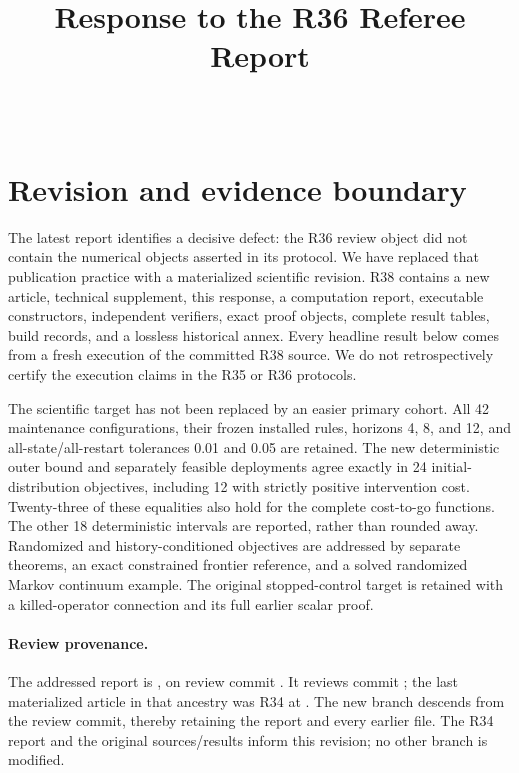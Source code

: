 

\begin{frontmatter}
\title{Response to the R36 Referee Report}
\begin{aug}\author[id=au1,addressref={add1}]{~}\address[id=add1]{}\end{aug}
\end{frontmatter}

\section{Revision and evidence boundary}
The latest report identifies a decisive defect: the R36 review object did not contain the numerical objects asserted in its protocol. We have replaced that publication practice with a materialized scientific revision. R38 contains a new article, technical supplement, this response, a computation report, executable constructors, independent verifiers, exact proof objects, complete result tables, build records, and a lossless historical annex. Every headline result below comes from a fresh execution of the committed R38 source. We do not retrospectively certify the execution claims in the R35 or R36 protocols.

The scientific target has not been replaced by an easier primary cohort. All 42 maintenance configurations, their frozen installed rules, horizons 4, 8, and 12, and all-state/all-restart tolerances 0.01 and 0.05 are retained. The new deterministic outer bound and separately feasible deployments agree exactly in 24 initial-distribution objectives, including 12 with strictly positive intervention cost. Twenty-three of these equalities also hold for the complete cost-to-go functions. The other 18 deterministic intervals are reported, rather than rounded away. Randomized and history-conditioned objectives are addressed by separate theorems, an exact constrained frontier reference, and a solved randomized Markov continuum example. The original stopped-control target is retained with a killed-operator connection and its full earlier scalar proof.

\paragraph{Review provenance.} The addressed report is
,
on review commit .
It reviews commit ;
the last materialized article in that ancestry was R34 at
.
The new branch descends from the review commit, thereby retaining the report and every earlier file. The R34 report and the original sources/results inform this revision; no other branch is modified.

